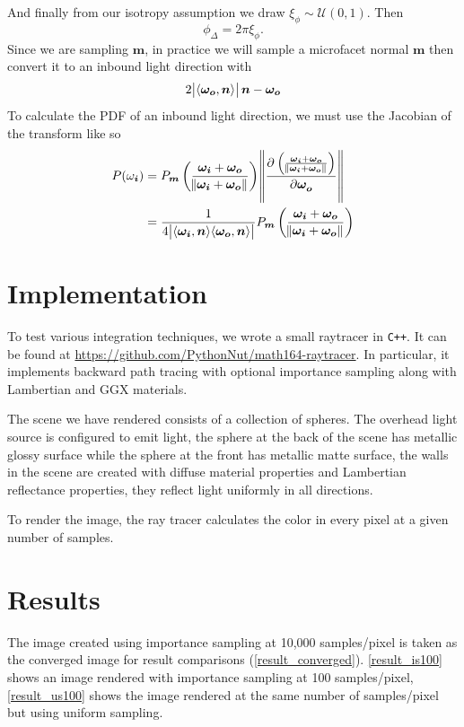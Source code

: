 \documentclass[12pt]{article}
\DeclarePairedDelimiter\ip{\langle }{\rangle}
\begin{document}
And finally from our isotropy assumption we draw \(\xi_\phi \sim \mathcal{U}(0, 1)\).
Then
\[\phi_\Delta = 2\pi\xi_\phi .\]
Since we are sampling \(\bm m\), in practice we will sample a microfacet normal \( \bm m\) then convert it to an inbound light direction with \autocite{taylor_2016}
\[2\abs{\ip{\bm{\omega_o}, \bm n}}\bm n-  \bm{\omega_o}\]
To calculate the PDF of an inbound light direction, we must use the Jacobian of the transform like so
\begin{align*}
  P(\omega_{\bm i}) &= P_{\bm m}\del{\frac{\bm{\omega_i} + \bm{\omega_o}}{\norm{\bm{\omega_i} + \bm{\omega_o}}} } \norm{\dpd{\del{\frac{\bm{\omega_i} + \bm{\omega_o}}{\norm{\bm{\omega_i} + \bm{\omega_o}}}}}{\bm{\omega_o}}}\\
   &= \frac{1}{4\abs{\ip{\bm{\omega_i}, \bm n}\ip{\bm{\omega_o}, \bm n}}}P_{\bm m}\del{\frac{\bm{\omega_i} + \bm{\omega_o}}{\norm{\bm{\omega_i} + \bm{\omega_o}}} }
\end{align*}
\section{Implementation}

To test various integration techniques, we wrote a small raytracer in \texttt{C++}.
It can be found at \url{https://github.com/PythonNut/math164-raytracer}.
In particular, it implements backward path tracing with optional importance sampling along with Lambertian and GGX materials.

The scene we have rendered consists of a collection of spheres. The overhead light source is configured to emit light, the sphere at the back of the scene has metallic glossy surface while the sphere at the front has metallic matte surface, the walls in the scene are created with diffuse material properties and Lambertian reflectance properties, they reflect light uniformly in all directions.

To render the image, the ray tracer calculates the color in every pixel at a given number of samples.
\section{Results}
The image created using importance sampling at 10,000 samples/pixel is taken as the converged image for result comparisons (\cref{result_converged}).
\cref{result_is100} shows an image rendered with importance sampling at 100 samples/pixel, \cref{result_us100} shows the image rendered at the same number of samples/pixel but using uniform sampling.
\end{document}
